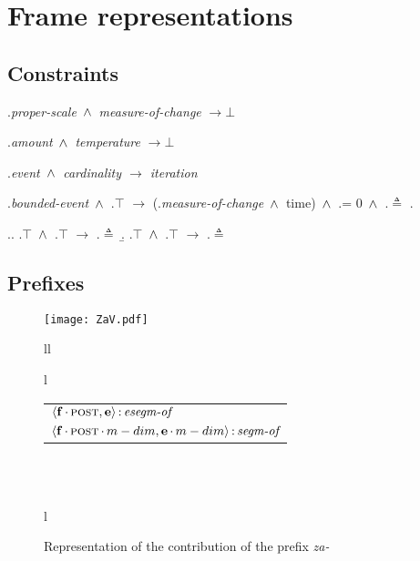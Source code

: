 \chapter{Frame representations}\label{AppendixA}
\section{Constraints}\label{app:constraints}
\ex.\label{app:const:proper}\textit{proper-scale} $\,\wedge\,$ \textit{measure-of-change} $\rightarrow \bot$

\ex.\label{app:const:temp:amount}\textit{amount} $\,\wedge\,$ \textit{temperature} $\rightarrow \bot$

\ex.\label{app:const:card}\textit{event $\,\wedge\,$ cardinality $\rightarrow$ iteration}

\ex.\label{app:constr:duration}\textit{bounded-event} $\,\wedge\,$ \DURATION .$\top$ $\rightarrow$ (\MDIM .\textit{measure-of-change} $\,\wedge\,$ time) $\,\wedge\,$  \MDIM .\MIN = 0 $\,\wedge\,$ \MDIM .\MAX $\triangleq$ \DURATION .\VAL

\ex.\label{app:rule:minmaxevent}\a. \MIN .$\top$ $\,\wedge\,$ \INIT .$\top$ $\rightarrow$ \INIT .\POS $\triangleq$ \MIN
\b. \MAX .$\top$ $\,\wedge\,$ \FIN .$\top$ $\rightarrow$ \FIN .\POS $\triangleq$ \MAX

\section{Prefixes}\label{app:pref}

\begin{figure}[H]
\centering
\texttt{[image: ZaV.pdf]}\\
\begin{tabular}[t]{ll}
\begin{tabular}[t]{l}
\end{tabular}
\begin{footnotesize}
\begin{tabular}[t]{l}
$\langle{\textbf{\textrm{f}}\,{\cdot}\,\textsc{post},\textbf{\textrm{e}}}\rangle\,{:}\,\textit{esegm-of}$\\[1ex]
$\tuple{\btag{f}\BC\POST\C\MDIM,\btag{e}\BC\MDIM}\D\type{segm-of}$\\
\end{tabular}
\end{footnotesize}
\\\\
\begin{tabular}[t]{l}
\hfill
\end{tabular}
\end{tabular}
\hfill
\caption{Representation of the contribution of the prefix \textit{za-}}
\label{app:za.frame.semantics}
\end{figure}

